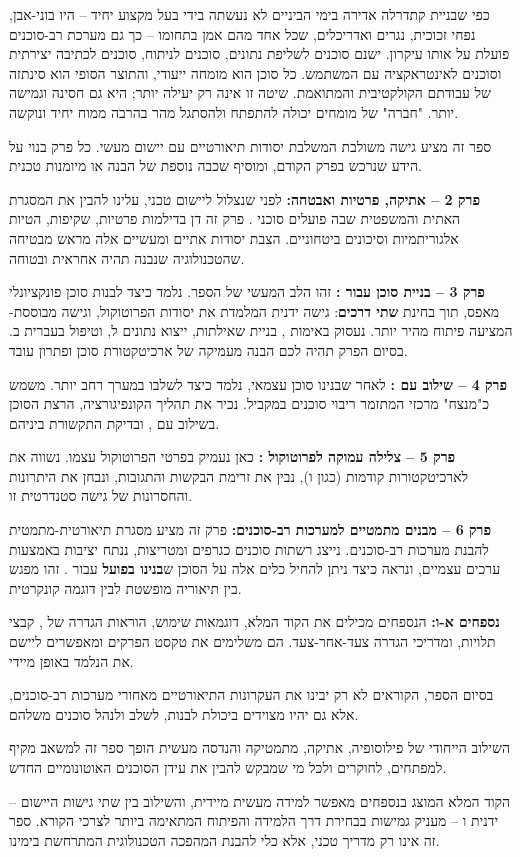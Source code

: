 כפי שבניית קתדרלה אדירה בימי הביניים לא נעשתה בידי בעל מקצוע יחיד – היו בוני-אבן, נפחי זכוכית, נגרים ואדריכלים, שכל אחד מהם אמן בתחומו – כך גם מערכת רב-סוכנים פועלת על אותו עיקרון. ישנם סוכנים לשליפת נתונים, סוכנים לניתוח, סוכנים לכתיבה יצירתית וסוכנים לאינטראקציה עם המשתמש. כל סוכן הוא מומחה ייעודי, והתוצר הסופי הוא סינתזה של עבודתם הקולקטיבית והמתואמת. שיטה זו אינה רק יעילה יותר; היא גם חסינה וגמישה יותר. "חברה" של מומחים יכולה להתפתח ולהסתגל מהר בהרבה ממוח יחיד ונוקשה\cite{Hendrycks2024}.


ספר זה מציע גישה משולבת המשלבת יסודות תיאורטיים עם יישום מעשי. כל פרק בנוי על הידע שנרכש בפרק הקודם, ומוסיף שכבה נוספת של הבנה או מיומנות טכנית.

\textbf{פרק \num{2} – אתיקה, פרטיות ואבטחה:} לפני שנצלול ליישום טכני, עלינו להבין את המסגרת האתית והמשפטית שבה פועלים סוכני . פרק זה דן בדילמות פרטיות, שקיפות, הטיות אלגוריתמיות וסיכונים ביטחוניים. הצבת יסודות אתיים ומעשיים אלה מראש מבטיחה שהטכנולוגיה שנבנה תהיה אחראית ובטוחה.

\textbf{פרק \num{3} – בניית סוכן  עבור :} זהו הלב המעשי של הספר. נלמד כיצד לבנות סוכן פונקציונלי מאפס, תוך בחינת \textbf{שתי דרכים}: גישה ידנית המלמדת את יסודות הפרוטוקול, וגישה מבוססת- המציעה פיתוח מהיר יותר. נעסוק באימות , בניית שאילתות, ייצוא נתונים ל, וטיפול בעברית ב. בסיום הפרק תהיה לכם הבנה מעמיקה של ארכיטקטורת סוכן ופתרון עובד.

\textbf{פרק \num{4} – שילוב עם :} לאחר שבנינו סוכן עצמאי, נלמד כיצד לשלבו במערך רחב יותר.  משמש כ"מנצח" מרכזי המתזמר ריבוי סוכנים במקביל. נכיר את תהליך הקונפיגורציה, הרצת הסוכן בשילוב עם , ובדיקת התקשורת ביניהם.

\textbf{פרק \num{5} – צלילה עמוקה לפרוטוקול :} כאן נעמיק בפרטי הפרוטוקול עצמו. נשווה את  לארכיטקטורות קודמות (כגון  ו), נבין את זרימת הבקשות והתגובות, ונבחן את היתרונות והחסרונות של גישה סטנדרטית זו.

\textbf{פרק \num{6} – מבנים מתמטיים למערכות רב-סוכנים:} פרק זה מציע מסגרת תיאורטית-מתמטית להבנת מערכות רב-סוכנים. נייצג רשתות סוכנים כגרפים ומטריצות, ננתח יציבות באמצעות ערכים עצמיים, ונראה כיצד ניתן להחיל כלים אלה על הסוכן ש\textbf{בנינו בפועל} עבור . זהו מפגש בין תיאוריה מופשטת לבין דוגמה קונקרטית.

\textbf{נספחים א-ו:} הנספחים מכילים את הקוד המלא, דוגמאות שימוש, הוראות הגדרה של , קבצי תלויות, ומדריכי הגדרה צעד-אחר-צעד. הם משלימים את טקסט הפרקים ומאפשרים ליישם את הנלמד באופן מיידי.

בסיום הספר, הקוראים לא רק יבינו את העקרונות התיאורטיים מאחורי מערכות רב-סוכנים, אלא גם יהיו מצוידים ביכולת לבנות, לשלב ולנהל סוכנים משלהם.

השילוב הייחודי של פילוסופיה, אתיקה, מתמטיקה והנדסה מעשית הופך ספר זה למשאב מקיף למפתחים, לחוקרים ולכל מי שמבקש להבין את עידן הסוכנים האוטונומיים החדש.

הקוד המלא המוצג בנספחים מאפשר למידה מעשית מיידית, והשילוב בין שתי גישות היישום – ידנית ו – מעניק גמישות בבחירת דרך הלמידה והפיתוח המתאימה ביותר לצרכי הקורא. ספר זה אינו רק מדריך טכני, אלא כלי להבנת המהפכה הטכנולוגית המתרחשת בימינו.
